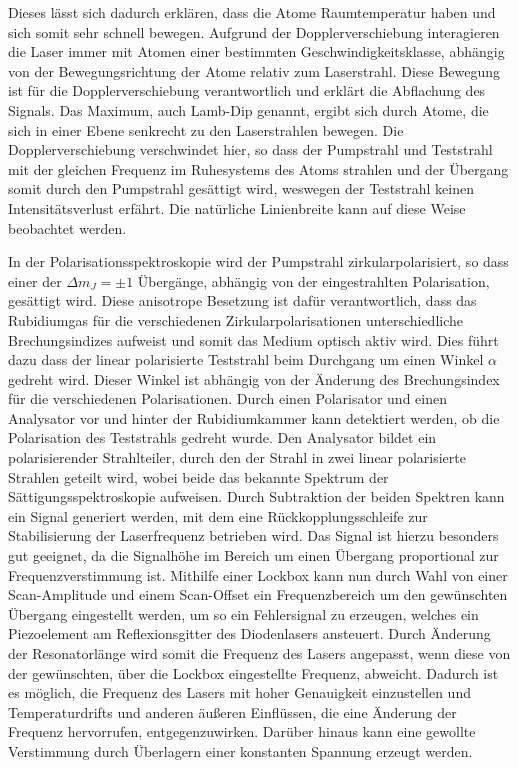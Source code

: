\documentclass[11pt, a4paper]{article}
\numberwithin{equation}{section}
\begin{document}
Dieses lässt sich dadurch erklären, dass die Atome Raumtemperatur haben und sich somit sehr schnell bewegen.
Aufgrund der Dopplerverschiebung interagieren die Laser immer mit Atomen einer bestimmten Geschwindigkeitsklasse, abhängig von der Bewegungsrichtung der Atome relativ zum Laserstrahl.
Diese Bewegung ist für die Dopplerverschiebung verantwortlich und erklärt die Abflachung des Signals.
Das Maximum, auch Lamb-Dip genannt, ergibt sich durch Atome, die sich in einer Ebene senkrecht zu den Laserstrahlen bewegen.
Die Dopplerverschiebung verschwindet hier, so dass der Pumpstrahl und Teststrahl mit der gleichen Frequenz im Ruhesystems des Atoms strahlen und der Übergang somit durch den Pumpstrahl gesättigt wird, weswegen der Teststrahl keinen Intensitätsverlust erfährt.
Die natürliche Linienbreite kann auf diese Weise beobachtet werden.

In der Polarisationsspektroskopie wird der Pumpstrahl zirkularpolarisiert, so dass einer der $\Delta m_J=\pm1$ Übergänge, abhängig von der eingestrahlten Polarisation, gesättigt wird.
Diese anisotrope Besetzung ist dafür verantwortlich, dass das Rubidiumgas für die verschiedenen Zirkularpolarisationen unterschiedliche Brechungsindizes aufweist und somit das Medium optisch aktiv wird.
Dies führt dazu dass der linear polarisierte Teststrahl beim Durchgang um einen Winkel $\alpha$ gedreht wird.
Dieser Winkel ist abhängig von der Änderung des Brechungsindex für die verschiedenen Polarisationen.
Durch einen Polarisator und einen Analysator vor und hinter der Rubidiumkammer kann detektiert werden, ob die Polarisation des Teststrahls gedreht wurde.
Den Analysator bildet ein polarisierender Strahlteiler, durch den der Strahl in zwei linear polarisierte Strahlen geteilt wird, wobei beide das bekannte Spektrum der Sättigungsspektroskopie aufweisen.
Durch Subtraktion der beiden Spektren kann ein Signal generiert werden, mit dem eine Rückkopplungsschleife zur Stabilisierung der Laserfrequenz betrieben wird.
Das Signal ist hierzu besonders gut geeignet, da die Signalhöhe im Bereich um einen Übergang proportional zur Frequenzverstimmung ist.
Mithilfe einer Lockbox kann nun durch Wahl von einer Scan-Amplitude und einem Scan-Offset ein Frequenzbereich um den gewünschten Übergang eingestellt werden, um so ein Fehlersignal zu erzeugen, welches ein Piezoelement am Reflexionsgitter des Diodenlasers ansteuert.
Durch Änderung der Resonatorlänge wird somit die Frequenz des Lasers angepasst, wenn diese von der gewünschten, über die Lockbox eingestellte Frequenz, abweicht.
Dadurch ist es möglich, die Frequenz des Lasers mit hoher Genauigkeit einzustellen und Temperaturdrifts und anderen äußeren Einflüssen, die eine Änderung der Frequenz hervorrufen, entgegenzuwirken.
Darüber hinaus kann eine gewollte Verstimmung durch Überlagern einer konstanten Spannung erzeugt werden.
\end{document}
